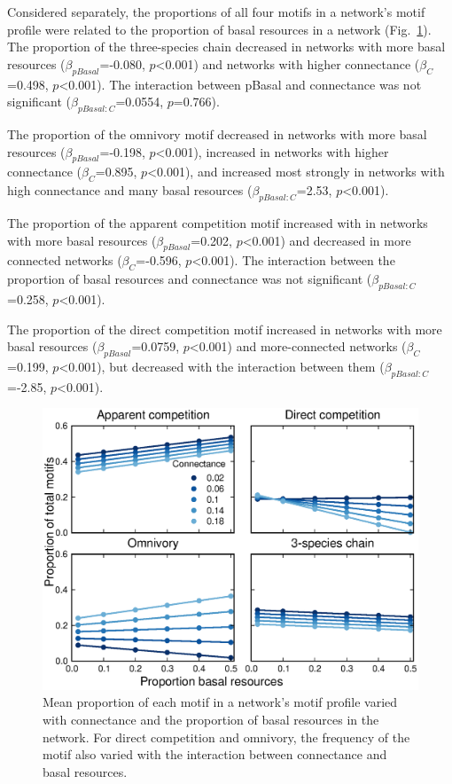 \documentclass[12pt]{article}
\begin{document}
\begin{spacing}{2.0}
        
        Considered separately, the proportions of all four motifs in a network's motif profile were related to the proportion of basal resources in a network (Fig.~\ref{fig:Blms}).
        The proportion of the three-species chain decreased in networks with more basal resources ($\beta_{pBasal}$=-0.080, $p$\textless0.001) and networks with higher connectance ($\beta_{C}$=0.498, $p$\textless0.001).
        The interaction between pBasal and connectance was not significant ($\beta_{pBasal:C}$=0.0554, $p$=0.766).
        

        The proportion of the omnivory motif decreased in networks with more basal resources ($\beta_{pBasal}$=-0.198, $p$\textless0.001), increased in networks with higher connectance ($\beta_{C}$=0.895, $p$\textless0.001), and increased most strongly in networks with high connectance and many basal resources ($\beta_{pBasal:C}$=2.53, $p$\textless0.001).   
        
        The proportion of the apparent competition motif increased with in networks with more basal resources ($\beta_{pBasal}$=0.202, $p$\textless0.001) and decreased in more connected networks ($\beta_C$=-0.596, $p$\textless0.001). 
        The interaction between the proportion of basal resources and connectance was not significant ($\beta_{pBasal:C}$=0.258, $p$\textless0.001).
        
        
        The proportion of the direct competition motif increased in networks with more basal resources ($\beta_{pBasal}$=0.0759, $p$\textless0.001) and more-connected networks ($\beta_C$=0.199, $p$\textless0.001), but decreased with the interaction between them ($\beta_{pBasal:C}$=-2.85, $p$\textless0.001).

        
        \begin{figure}
            \centering
            \includegraphics[width=.75\textwidth]{figures/motif_proportion_basal_lms.eps}
            \caption{Mean proportion of each motif in a network's motif profile varied with connectance and the proportion of basal resources in the network. For direct competition and omnivory, the frequency of the motif also varied with the interaction between connectance and basal resources.}
            \label{fig:Blms}
        \end{figure}    
    

\end{spacing}
\end{document}
